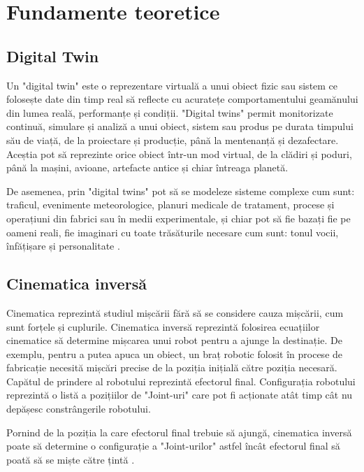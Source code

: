 \clearpage




\setcounter{page}{7}
\section{Fundamente teoretice}
\subsection{Digital Twin}
Un "digital twin" este o reprezentare virtuală a unui obiect fizic sau sistem ce folosește date din timp real să reflecte cu acuratețe comportamentului geamănului din lumea reală, performanțe și condiții.
"Digital twins" permit monitorizate continuă, simulare și analiză a unui obiect, sistem sau produs pe durata timpului său de viață, de la proiectare și producție, până la mentenanță și dezafectare.
Aceștia pot  să reprezinte orice obiect într-un mod virtual, de la clădiri și poduri, până la mașini, avioane, artefacte antice și chiar întreaga planetă\cite{DigTwinIBM}. 

De asemenea, prin "digital twins"  pot să se modeleze sisteme complexe cum sunt: traficul, evenimente meteorologice, planuri medicale de tratament, procese și operațiuni din fabrici sau în medii experimentale, și chiar pot să fie bazați fie pe oameni reali, fie imaginari cu toate trăsăturile necesare cum sunt: tonul vocii, înfățișare și personalitate \cite{DigTwinIBM}. 


\subsection{Cinematica inversă}
Cinematica reprezintă studiul mișcării fără să se considere cauza mișcării, cum sunt forțele și cuplurile. Cinematica inversă reprezintă folosirea ecuațiilor cinematice să determine mișcarea unui robot pentru a ajunge la destinație. De exemplu, pentru a putea apuca un obiect, un braț robotic folosit în procese de fabricație necesită mișcări precise de la poziția inițială către poziția necesară. Capătul de prindere al robotului reprezintă efectorul final. Configurația robotului reprezintă o listă a pozițiilor de "Joint-uri" care pot fi acționate atât timp cât nu depășesc constrângerile robotului.

 Pornind de la poziția la care efectorul final trebuie să ajungă, cinematica inversă poate să determine o configurație a  "Joint-urilor" astfel încât efectorul final să poată să se miște către țintă \cite{IK}.

